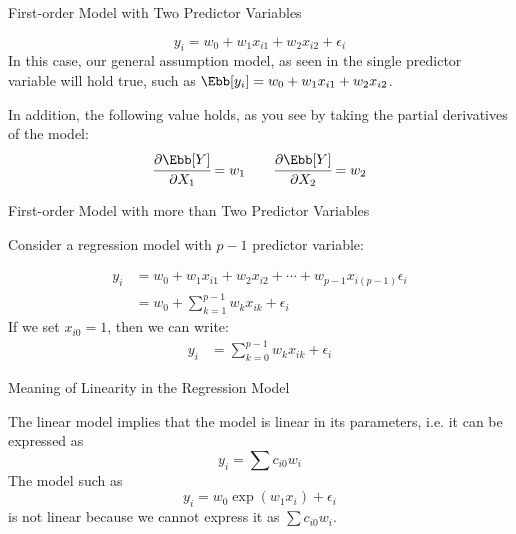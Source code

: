\documentclass[aspectratio=169,xcolor=dvipsnames,svgnames,x11names,fleqn]{beamer}
\begin{document}
\begin{frame}{First-order Model with Two Predictor Variables}


        \begin{equation}
            y_i = w_0 + w_1 x_{i1} + w_2 x_{i2} + \epsilon_i
        \end{equation}
        In this case, our general assumption model, as seen in the single predictor variable will hold true, such as $\Ebb[y_i] = w_0 + w_1 x_{i1} + w_2 x_{i2} $.
    
        \vspace{10pt}
        In addition, the following value holds, as you see by taking the partial derivatives of the model:
        \begin{equation}
            \begin{aligned}
                 \cfrac{\partial \Ebb[Y]}{\partial X_1}  = w_1 \quad \quad
                 \cfrac{\partial \Ebb[Y]}{\partial X_2}  = w_2
            \end{aligned}
        \end{equation}
       

    \end{frame}

\begin{frame}{First-order Model with more than Two Predictor Variables}

    Consider a regression model with $p-1$ predictor variable:

    
     \begin{equation}
     \begin{aligned}
            y_i & = w_0 + w_1 x_{i1} + w_2 x_{i2} + \cdots + w_{p-1} x_{i(p-1)} \epsilon_i\\
            & =  w_0 + \sum_{k = 1}^{p-1} w_k x_{ik} + \epsilon_i
             \end{aligned}
        \end{equation}
        If we set $x_{i0} = 1$, then we can write:
        \begin{equation}
     \begin{aligned}
            y_i & =   \sum_{k = 0}^{p-1} w_k x_{ik} + \epsilon_i
             \end{aligned}
        \end{equation}

        
    \end{frame}

\begin{frame}{Meaning of Linearity in the Regression Model}

    The linear model implies that the model is linear in its parameters, i.e. it can be expressed as
    $$
    y_i = \sum c_{i0}w_i
    $$
     The model such as 
     $$
     y_i = w_0 \exp(w_1 x_i) + \epsilon_i
     $$
     is not linear because we cannot express it as $ \sum c_{i0}w_i$.
    \end{frame}
\end{document}
